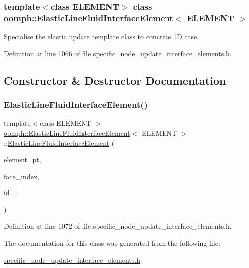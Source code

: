 \subsubsection*{template$<$class E\+L\+E\+M\+E\+NT$>$\newline
class oomph\+::\+Elastic\+Line\+Fluid\+Interface\+Element$<$ E\+L\+E\+M\+E\+N\+T $>$}

Specialise the elastic update template class to concrete 1D case. 

Definition at line 1066 of file specific\+\_\+node\+\_\+update\+\_\+interface\+\_\+elements.\+h.



\subsection{Constructor \& Destructor Documentation}
\mbox{\label{classoomph_1_1ElasticLineFluidInterfaceElement_ab0dde23477404e1c97956e40cfe361ab}} 
\subsubsection{\texorpdfstring{Elastic\+Line\+Fluid\+Interface\+Element()}{ElasticLineFluidInterfaceElement()}}
{\footnotesize\ttfamily template$<$class E\+L\+E\+M\+E\+NT $>$ \\
\hyperlink{classoomph_1_1ElasticLineFluidInterfaceElement}{oomph\+::\+Elastic\+Line\+Fluid\+Interface\+Element}$<$ E\+L\+E\+M\+E\+NT $>$\+::\hyperlink{classoomph_1_1ElasticLineFluidInterfaceElement}{Elastic\+Line\+Fluid\+Interface\+Element} (\begin{DoxyParamCaption}\item[{\hyperlink{classoomph_1_1FiniteElement}{Finite\+Element} $\ast$const \&}]{element\+\_\+pt,  }\item[{const int \&}]{face\+\_\+index,  }\item[{const unsigned \&}]{id = {} }\end{DoxyParamCaption})\hspace{0.3cm}{\ttfamily [inline]}}



Definition at line 1072 of file specific\+\_\+node\+\_\+update\+\_\+interface\+\_\+elements.\+h.



The documentation for this class was generated from the following file\+:\begin{DoxyCompactItemize}
\item 
\hyperlink{specific__node__update__interface__elements_8h}{specific\+\_\+node\+\_\+update\+\_\+interface\+\_\+elements.\+h}\end{DoxyCompactItemize}
